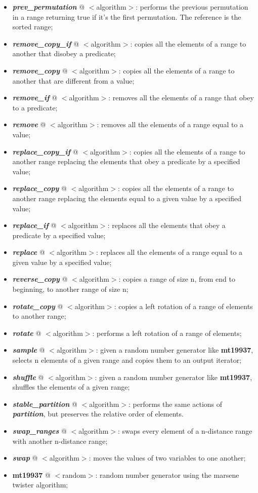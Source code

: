 \documentclass[10pt]{article}
\begin{document}
\begin{multicols*}{5}
{\begin{itemize}[leftmargin=*,topsep=0.25pt]
	\item  \emph{\textbf{prev\_permutation}} @ $<$algorithm$>$: performs the previous permutation in a range returning true if it's the first permutation. The reference is the sorted range;
	\item  \emph{\textbf{remove\_copy\_if}} @ $<$algorithm$>$: copies all the elements of a range to another that disobey a predicate; 
	\item  \emph{\textbf{remove\_copy}} @ $<$algorithm$>$: copies all the elements of a range to another that are different from a value;
	\item  \emph{\textbf{remove\_if}} @ $<$algorithm$>$: removes all the elements of a range that obey to a predicate; 
	\item  \emph{\textbf{remove}} @ $<$algorithm$>$: removes all the elements of a range equal to a value;
	\item  \emph{\textbf{replace\_copy\_if}} @ $<$algorithm$>$: copies all the elements of a range to another range replacing the elements that obey a predicate by a specified value;
	\item  \emph{\textbf{replace\_copy}} @ $<$algorithm$>$: copies all the elements of a range to another range replacing the elements equal to a given value by a specified value;
	\item  \emph{\textbf{replace\_if}} @ $<$algorithm$>$: replaces all the elements that obey a predicate by a specified value;
	\item  \emph{\textbf{replace}} @ $<$algorithm$>$: replaces all the elements of a range equal to a given value by a specified value;
	\item  \emph{\textbf{reverse\_copy}} @ $<$algorithm$>$: copies a range of size n, from end to beginning, to another range of size n;
	\item  \emph{\textbf{rotate\_copy}} @ $<$algorithm$>$: copies a left rotation of a range of elements to another range;
	\item  \emph{\textbf{rotate}} @ $<$algorithm$>$: performs a left rotation of a range of elements;
	\item  \emph{\textbf{sample}} @ $<$algorithm$>$: given a random number generator like {\textbf{mt19937}}, selects n elements of a given range and copies them to an output iterator;
	\item  \emph{\textbf{shuffle}} @ $<$algorithm$>$: given a random number generator like {\textbf{mt19937}}, shuffles the elements of a given range;
	\item  \emph{\textbf{stable\_partition}} @ $<$algorithm$>$: performs the same actions of  \emph{\textbf{partition}}, but preserves the relative order of elements. 
	\item  \emph{\textbf{swap\_ranges}} @ $<$algorithm$>$: swaps every element of a n-distance range with another n-distance range;
	\item  \emph{\textbf{swap}} @ $<$algorithm$>$: moves the values of two variables to one another;
	\item  {\textbf{mt19937}} @ $<$random$>$: random number generator using the marsene twister algorithm;
\end{itemize}

}
\end{multicols*}
\end{document}
